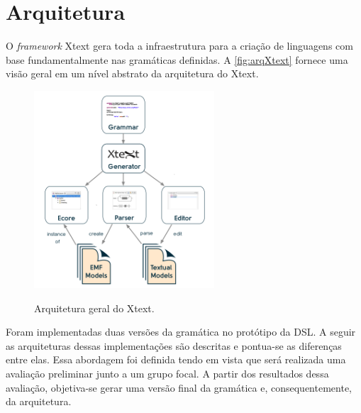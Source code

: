 \section{Arquitetura} \label{sec:arqDSL}

O \textit{framework} Xtext gera toda a infraestrutura para a criação de linguagens com base fundamentalmente nas gramáticas definidas. 
A \autoref{fig:arqXtext} fornece uma visão geral em um nível abstrato da arquitetura do Xtext. 

\begin{figure}[!htb]
    \centering
    \caption{Arquitetura geral do Xtext.}
    \includegraphics[width=0.6\textwidth]{img/ArquiteturaXtext.jpg}
    \label{fig:arqXtext}
\end{figure}

Foram implementadas duas versões da gramática no protótipo da \ac{DSL}. 
A seguir as arquiteturas dessas implementações são descritas e pontua-se as diferenças entre elas. 
Essa abordagem foi definida tendo em vista que será realizada uma avaliação preliminar junto a um grupo focal. 
A partir dos resultados dessa avaliação, objetiva-se gerar uma versão final da gramática e, consequentemente, da arquitetura.

